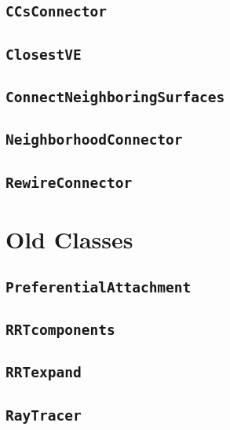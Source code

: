 \subsection{\texttt{CCsConnector}}

\subsection{\texttt{ClosestVE}}

\subsection{\texttt{ConnectNeighboringSurfaces}}

\subsection{\texttt{NeighborhoodConnector}}

\subsection{\texttt{RewireConnector}}

\section{Old Classes}

\subsection{\texttt{PreferentialAttachment}}

\subsection{\texttt{RRTcomponents}}

\subsection{\texttt{RRTexpand}}

\subsection{\texttt{RayTracer}}

